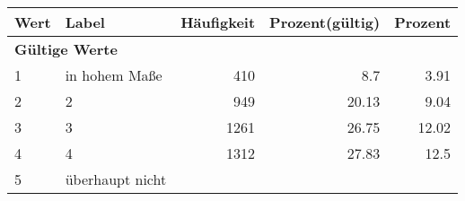      \begin{longtable}{lXrrr}
     \toprule
     \textbf{Wert} & \textbf{Label} & \textbf{Häufigkeit} & \textbf{Prozent(gültig)} & \textbf{Prozent} \\
     \endhead
     \midrule
     \multicolumn{5}{l}{\textbf{Gültige Werte}}\\

     1 &
     \multicolumn{1}{X}{ in hohem Maße   } &


       \num{410} &
       \num[round-mode=places,round-precision=2]{8,7} &
         \num[round-mode=places,round-precision=2]{3,91} \\

     2 &
     \multicolumn{1}{X}{ 2   } &


       \num{949} &
       \num[round-mode=places,round-precision=2]{20,13} &
         \num[round-mode=places,round-precision=2]{9,04} \\

     3 &
     \multicolumn{1}{X}{ 3   } &


       \num{1261} &
       \num[round-mode=places,round-precision=2]{26,75} &
         \num[round-mode=places,round-precision=2]{12,02} \\

     4 &
     \multicolumn{1}{X}{ 4   } &


       \num{1312} &
       \num[round-mode=places,round-precision=2]{27,83} &
         \num[round-mode=places,round-precision=2]{12,5} \\

     5 &
     \multicolumn{1}{X}{ überhaupt nicht   } &



\end{longtable}
